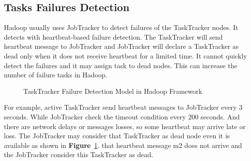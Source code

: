 \documentclass[12pt,oneside,openright,a4paper]{cpe-english-project}
\begin{document}
\subsection{Tasks Failures Detection}
Hadoop usually uses JobTracker to detect failures of the TaskTracker nodes.  It detects with heartbeat-based failure detection.  The TaskTracker will send heartbeat message to JobTracker and JobTracker will declare a TaskTracker as dead only when it does not receive heartbeat for a limited time.  It cannot quickly detect the failures and it may assign task to dead nodes.  This can increase the number of failure tasks in Hadoop. \cite{adaptiveScheduling}

\begin{figure}[!h]\centering
\setlength{\fboxrule}{0mm} %
\setlength{\fboxsep}{0cm}
\caption{TaskTracker Failure Detection Model in Hadoop Framework \cite{adaptiveScheduling}}\label{fig:tasktracker}
\end{figure}

For example, active TaskTracker send heartbeat messages to JobTracker every 3 seconds.  While JobTracker check the timeout condition every 200 seconds.  And there are network delays or messages losses, so some heartbeat may arrive late or loss.  The JobTracker may consider that TaskTracker as dead node even it is available as shown in \textbf{Figure}~\ref{fig:tasktracker}. that heartbeat message m2 does not arrive and the JobTracker consider this TaskTracker as dead.

\newpage
\end{document}
